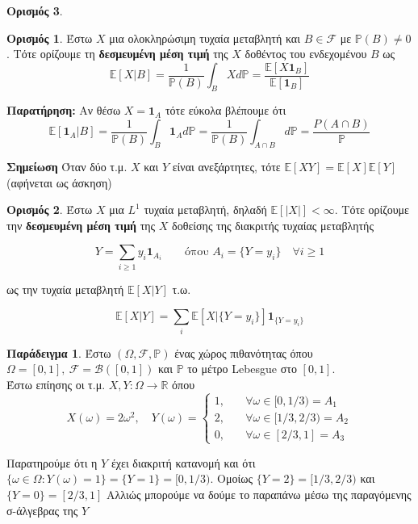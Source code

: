 \documentclass[12pt,a4paper]{article}
\theoremstyle{definition}
\numberwithin{equation}{section}
\newtheorem{paradeigma}{Παράδειγμα}
\newtheorem{orismos}{Ορισμός}
\begin{document}
{\begin{orismos}
\begin{orismos}
    Έστω $X$ μια ολοκληρώσιμη τυχαία μεταβλητή και $B \in \mathcal{F}$ με $\mathbb{P}(B) \neq 0$. Τότε ορίζουμε τη \textbf{δεσμευμένη μέση τιμή} της $X$ δοθέντος του
    ενδεχομένου $B$ ως
$$ \mathbb{E}[X|B] = \frac{1}{\mathbb{P}(B)}\int_B Xd\mathbb{P} = \frac{\mathbb{E}[X\mathbf{1}_B]}{\mathbb{E}[\mathbf{1}_B]} $$
\end{orismos}

\textbf{Παρατήρηση:} Αν θέσω \(X = \mathbf{1}_A\) τότε εύκολα βλέπουμε ότι
$$\mathbb{E}[\mathbf{1}_A|B] = \frac{1}{\mathbb{P}(B)}\int_B \mathbf{1}_A d \mathbb{P} = \frac{1}{\mathbb{P}(B)} \int_{A\cap B} d\mathbb{P} = \frac{P(A\cap B)}{\mathbb{P}}$$

\textbf{Σημείωση} Όταν δύο τ.μ. \(X\) και \(Y\) είναι ανεξάρτητες, τότε \(\mathbb{E}[XY] = \mathbb{E}[X] \mathbb{E}[Y]\) (αφήνεται ως άσκηση)


\begin{orismos}
    Έστω $X$ μια $L^1$ τυχαία μεταβλητή, δηλαδή $\mathbb{E}[|X|]<\infty$. Τότε ορίζουμε την \textbf{δεσμευμένη μέση τιμή} της $X$ δοθείσης της
    διακριτής τυχαίας μεταβλητής

  $$Y = \sum_{i\geq 1} y_i \mathbf{1}_{A_i} \qquad \text{όπου } A_i = \{Y = y_i \} \quad \forall i\geq 1$$

 ως την τυχαία μεταβλητή $\mathbb{E}[X|Y]$ τ.ω.

    $$\mathbb{E}[X|Y]  = \sum_i \mathbb{E}[X|\{Y = y_i\} ]\mathbf{1}_{ \{Y=y_i\} }$$
\end{orismos}


\begin{paradeigma}
Έστω $(\Omega,\mathcal{F},\mathbb{P})$ ένας χώρος πιθανότητας όπου $\Omega = [0,1],\: \mathcal{F} = \mathcal{B}([0,1])$ και $\mathbb{P}$ το μέτρο
\textlatin{Lebesgue} στο $[0,1]$.\\
Έστω επίησης οι τ.μ. $X,Y: \Omega \rightarrow \mathbb{R}$ όπου
$$ X(\omega) = 2\omega^2 , \quad Y(\omega) = \begin{cases}
                                                    1, \quad & \forall \omega \in [0,1/3) =A_1\\
                                                    2, \quad & \forall \omega \in [1/3,2/3)= A_2\\
                                                    0, \quad & \forall \omega \in [2/3, 1] = A_3
                                            \end{cases} $$

Παρατηρούμε ότι η $Y$ έχει διακριτή κατανομή και ότι $\{ \omega \in \Omega : Y(\omega) = 1\} = \{ Y = 1\} = [0,1/3)$. Ομοίως $\{Y=2\} = [1/3,2/3)$ και $\{Y=0\}= [2/3,1]$
Aλλιώς μπορούμε να δούμε το παραπάνω μέσω της παραγόμενης σ-άλγεβρας της $Y$


\end{paradeigma}
\end{orismos}}
\end{document}
